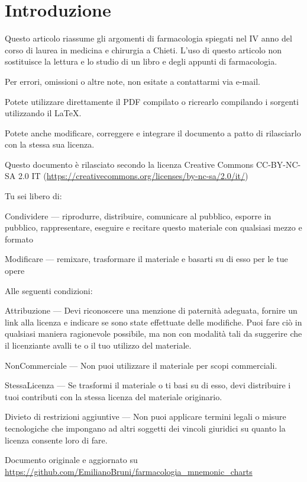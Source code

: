 \maketitle

\chapter{Introduzione}

	Questo articolo riassume gli argomenti di farmacologia spiegati nel IV anno del corso di laurea in medicina e chirurgia a Chieti.
	L'uso di questo articolo non sostituisce la lettura e lo studio di un libro e degli appunti di farmacologia.

Per errori, omissioni o altre note, non esitate a contattarmi via e-mail.

Potete utilizzare direttamente il PDF compilato o ricrearlo compilando i sorgenti utilizzando il \LaTeX. 

Potete anche modificare, correggere e integrare il documento a patto di rilasciarlo con la stessa sua licenza.

Questo documento è rilasciato secondo la licenza Creative Commons CC-BY-NC-SA 2.0 IT (\url{https://creativecommons.org/licenses/by-nc-sa/2.0/it/})

Tu sei libero di:

Condividere — riprodurre, distribuire, comunicare al pubblico, esporre in pubblico, rappresentare, eseguire e recitare questo materiale con qualsiasi mezzo e formato 

Modificare — remixare, trasformare il materiale e basarti su di esso per le tue opere

Alle seguenti condizioni:

Attribuzione — Devi riconoscere una menzione di paternità adeguata, fornire un link alla licenza e indicare se sono state effettuate delle modifiche. Puoi fare ciò in qualsiasi maniera ragionevole possibile, ma non con modalità tali da suggerire che il licenziante avalli te o il tuo utilizzo del materiale.

NonCommerciale — Non puoi utilizzare il materiale per scopi commerciali.

StessaLicenza — Se trasformi il materiale o ti basi su di esso, devi distribuire i tuoi contributi con la stessa licenza del materiale originario.

Divieto di restrizioni aggiuntive — Non puoi applicare termini legali o misure tecnologiche che impongano ad altri soggetti dei vincoli giuridici su quanto la licenza consente loro di fare.
	
Documento originale e aggiornato su \url{https://github.com/EmilianoBruni/farmacologia_mnemonic_charts}

\newpage

\tableofcontents

\newpage\newpage